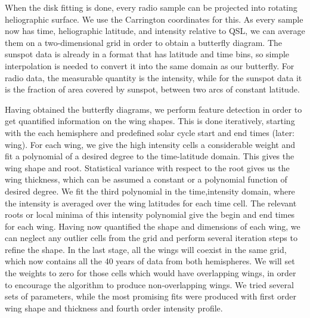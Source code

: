 \documentclass{aa}
\newcommand{\fag}[1]{\textcolor{midpurple}{[FAG: #1]}} %
\begin{document}
When the disk fitting is done, every radio sample can be projected into rotating heliographic surface. We use the 
Carrington coordinates for this. As every sample now has time, heliographic latitude, and intensity relative to QSL, we 
can average them on a two-dimensional grid in order to obtain a butterfly diagram. The sunspot data is already in a 
format that has latitude and time bins, so simple interpolation is needed to convert it into the same domain as our 
butterfly. For radio data, the measurable quantity is the intensity, while for the sunspot data it is the fraction of 
area covered by sunspot, between two arcs of constant latitude.

Having obtained the butterfly 
diagrams, we 
perform feature detection in order to get quantified information on the wing 
shapes. 
This is done iteratively, starting with the each hemisphere and predefined solar cycle start and end times 
(later: wing). For each wing, we give the high intensity cells a considerable weight and fit a polynomial of a desired 
degree to the time-latitude domain. This gives the wing shape and root. Statistical variance with respect to the root 
gives us the wing thickness, which can be assumed a constant or a polynomial function of desired degree. We fit the 
third polynomial in the time,intensity domain, where the intensity is averaged over the wing latitudes for each time 
cell. The relevant roots or local minima of this intensity polynomial give the begin and end times for each wing. Having 
now quantified the shape and dimensions of each wing, we can neglect any outlier cells from the grid and perform several 
iteration steps to refine the shape. In the last stage, all the wings will coexist in the same grid, which now contains 
all the 40 years of data from both hemispheres. We will set the weights to zero for those cells which would have 
overlapping wings, in order to encourage the algorithm to produce non-overlapping wings. We tried several sets of 
parameters, while the most promising fits were produced with first order wing shape and thickness and fourth order 
intensity profile.
\end{document}
